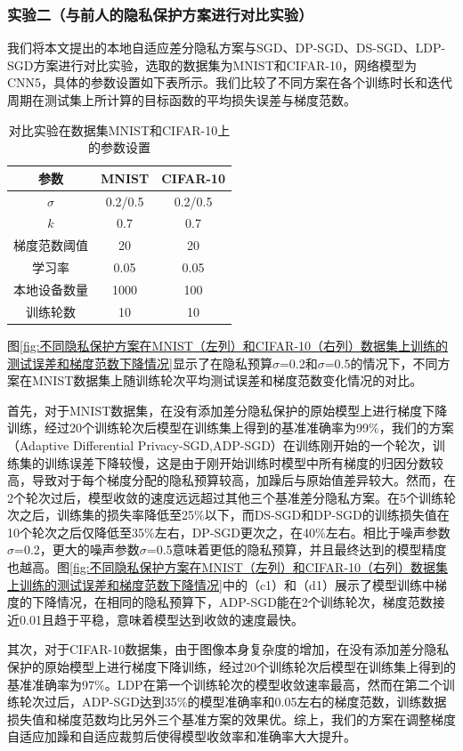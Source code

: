 \subsubsection{实验二（与前人的隐私保护方案进行对比实验）} 
我们将本文提出的本地自适应差分隐私方案与SGD、DP-SGD、DS-SGD、LDP-SGD方案进行对比实验，选取的数据集为MNIST和CIFAR-10，网络模型为CNN5，具体的参数设置如下表所示。我们比较了不同方案在各个训练时长和迭代周期在测试集上所计算的目标函数的平均损失误差与梯度范数。

\begin{table}[H]
	\centering
	\begin{tabular}{ccc}
		\hline
		参数& MNIST& CIFAR-10\\
		\hline
		$\sigma$& 0.2/0.5& 0.2/0.5\\
		$k$& 0.7& 0.7\\
		梯度范数阈值& 20& 20\\
		学习率& 0.05& 0.05\\
		本地设备数量& 1000& 100\\
		训练轮数& 10& 10\\
		\hline
	\end{tabular}
	\caption{对比实验在数据集MNIST和CIFAR-10上的参数设置}
	\label{tab1}
\end{table}

图\ref{fig:不同隐私保护方案在MNIST（左列）和CIFAR-10（右列）数据集上训练的测试误差和梯度范数下降情况}显示了在隐私预算$\sigma$=0.2和$\sigma$=0.5的情况下，不同方案在MNIST数据集上随训练轮次平均测试误差和梯度范数变化情况的对比。

首先，对于MNIST数据集，在没有添加差分隐私保护的原始模型上进行梯度下降训练，经过20个训练轮次后模型在训练集上得到的基准准确率为99\%，我们的方案（Adaptive Differential Privacy-SGD,ADP-SGD）在训练刚开始的一个轮次，训练集的训练误差下降较慢，这是由于刚开始训练时模型中所有梯度的归因分数较高，导致对于每个梯度分配的隐私预算较高，加躁后与原始值差异较大。然而，在2个轮次过后，模型收敛的速度远远超过其他三个基准差分隐私方案。在5个训练轮次之后，训练集的损失率降低至25\%以下，而DS-SGD和DP-SGD的训练损失值在10个轮次之后仅降低至35\%左右，DP-SGD更次之，在40\%左右。相比于噪声参数$\sigma$=0.2，更大的噪声参数$\sigma$=0.5意味着更低的隐私预算，并且最终达到的模型精度也越高。图\ref{fig:不同隐私保护方案在MNIST（左列）和CIFAR-10（右列）数据集上训练的测试误差和梯度范数下降情况}中的（c1）和（d1）展示了模型训练中梯度的下降情况，在相同的隐私预算下，ADP-SGD能在2个训练轮次，梯度范数接近0.01且趋于平稳，意味着模型达到收敛的速度最快。

其次，对于CIFAR-10数据集，由于图像本身复杂度的增加，在没有添加差分隐私保护的原始模型上进行梯度下降训练，经过20个训练轮次后模型在训练集上得到的基准准确率为97\%。LDP在第一个训练轮次的模型收敛速率最高，然而在第二个训练轮次过后，ADP-SGD达到35\%的模型准确率和0.05左右的梯度范数，训练数据损失值和梯度范数均比另外三个基准方案的效果优。综上，我们的方案在调整梯度自适应加躁和自适应裁剪后使得模型收敛率和准确率大大提升。

